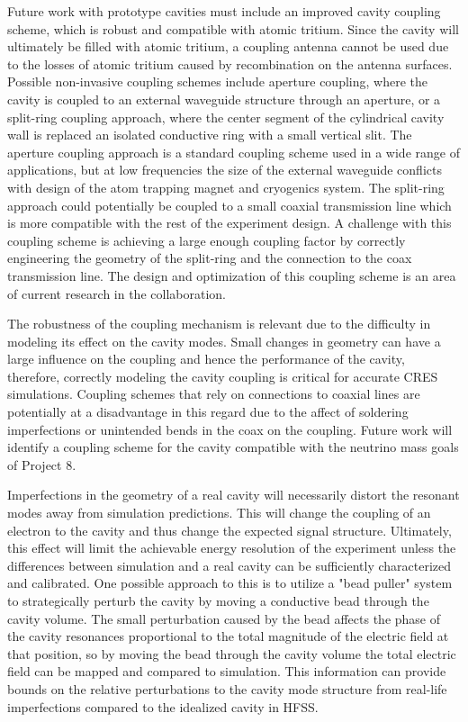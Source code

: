 Future work with prototype cavities must include an improved cavity coupling scheme, which is robust and compatible with atomic tritium. Since the cavity will ultimately be filled with atomic tritium, a coupling antenna cannot be used due to the losses of atomic tritium caused by recombination on the antenna surfaces. Possible non-invasive coupling schemes include aperture coupling, where the cavity is coupled to an external waveguide structure through an aperture, or a split-ring coupling approach, where the center segment of the cylindrical cavity wall is replaced an isolated conductive ring with a small vertical slit. The aperture coupling approach is a standard coupling scheme \cite{pozar} used in a wide range of applications, but at low frequencies the size of the external waveguide conflicts with design of the atom trapping magnet and cryogenics system. The split-ring approach could potentially be coupled to a small coaxial transmission line which is more compatible with the rest of the experiment design. A challenge with this coupling scheme is achieving a large enough coupling factor by correctly engineering the geometry of the split-ring and the connection to the coax transmission line. The design and optimization of this coupling scheme is an area of current research in the collaboration.

The robustness of the coupling mechanism is relevant due to the difficulty in modeling its effect on the cavity modes. Small changes in geometry can have a large influence on the coupling and hence the performance of the cavity, therefore, correctly modeling the cavity coupling is critical for accurate CRES simulations. Coupling schemes that rely on connections to coaxial lines are potentially at a disadvantage in this regard due to the affect of soldering imperfections or unintended bends in the coax on the coupling. Future work will identify a coupling scheme for the cavity compatible with the neutrino mass goals of Project 8.

Imperfections in the geometry of a real cavity will necessarily distort the resonant modes away from simulation predictions. This will change the coupling of an electron to the cavity and thus change the expected signal structure. Ultimately, this effect will limit the achievable energy resolution of the experiment unless the differences between simulation and a real cavity can be sufficiently characterized and calibrated. One possible approach to this is to utilize a "bead puller" system \cite{bead_pull} to strategically perturb the cavity by moving a conductive bead through the cavity volume. The small perturbation caused by the bead affects the phase of the cavity resonances proportional to the total magnitude of the electric field at that position, so by moving the bead through the cavity volume the total electric field can be mapped and compared to simulation. This information can provide bounds on the relative perturbations to the cavity mode structure from real-life imperfections compared to the idealized cavity in HFSS.
